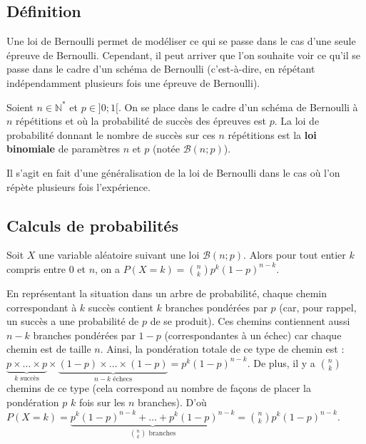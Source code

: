 	\subsection{Définition}

	Une loi de Bernoulli permet de modéliser ce qui se passe dans le cas d'une seule épreuve de Bernoulli. Cependant, il peut arriver que l'on souhaite voir ce qu'il se passe dans le cadre d'un schéma de Bernoulli (c'est-à-dire, en répétant indépendamment plusieurs fois une épreuve de Bernoulli).

	\begin{formula}[Définition]
		Soient $n \in \mathbb{N}^*$ et $p \in ]0; 1[$. On se place dans le cadre d'un schéma de Bernoulli à $n$ répétitions et où la probabilité de succès des épreuves est $p$.
		\newpar
		La loi de probabilité donnant le nombre de succès sur ces $n$ répétitions est la \textbf{loi binomiale} de paramètres $n$ et $p$ (notée $\mathcal{B}(n; p)$).
	\end{formula}

	\begin{tip}
		Il s'agit en fait d'une généralisation de la loi de Bernoulli dans le cas où l'on répète plusieurs fois l'expérience.
	\end{tip}

	\subsection{Calculs de probabilités}

	\begin{formula}
		Soit $X$ une variable aléatoire suivant une loi $\mathcal{B}(n; p)$. Alors pour tout entier $k$ compris entre $0$ et $n$, on a $\displaystyle{P(X = k) = \binom{n}{k} p^k (1-p)^{n-k}}$.
	\end{formula}

	\begin{demonstration}
		\contentwidth[big]
		En représentant la situation dans un arbre de probabilité, chaque chemin correspondant à $k$ succès contient $k$ branches pondérées par $p$ (car, pour rappel, un succès a une probabilité de $p$ de se produit). Ces chemins contiennent aussi $n-k$ branches pondérées par $1-p$ (correspondantes à un échec) car chaque chemin est de taille $n$. Ainsi, la pondération totale de ce type de chemin est :
		\newpar
		$\underbrace{p \times \dots \times p}_{k \text{ succès}} \times \underbrace{(1-p) \times \dots \times (1-p)}_{n-k \text{ échecs}} = p^k(1-p)^{n-k}$.
		\newpar
		De plus, il y a $\displaystyle{\binom{n}{k}}$ chemins de ce type (cela correspond au nombre de façons de placer la pondération $p$ $k$ fois sur les $n$ branches).
		\newpar
		D'où $\displaystyle{P(X = k) = \underbrace{p^k(1-p)^{n-k} + \dots + p^k(1-p)^{n-k}}_{\binom{n}{k} \text{ branches}} = \binom{n}{k} p^k(1-p)^{n-k}}$.
	\end{demonstration}

